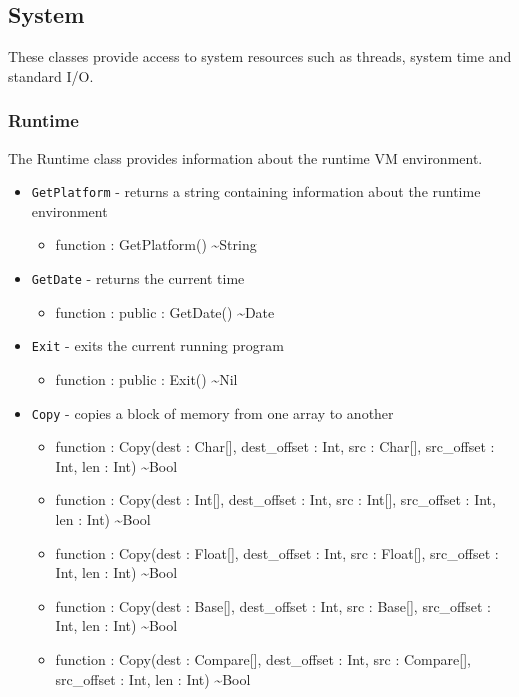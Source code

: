 \documentclass[11pt]{article}
\begin{document}
\subsection{System}
These classes provide access to system resources such as threads,
system time and standard I/O.

\subsubsection{Runtime}
The Runtime class provides information about the runtime VM
environment.
\begin{itemize}
\item \texttt{GetPlatform} - returns a string containing information
  about the runtime environment
  \begin{itemize}
  \item function : GetPlatform() \textasciitilde String
  \end{itemize}
\item \texttt{GetDate} - returns the current time
  \begin{itemize}
  \item function : public : GetDate() \textasciitilde Date
  \end{itemize}
\item \texttt{Exit} - exits the current running program
  \begin{itemize}
  \item function : public : Exit() \textasciitilde Nil
  \end{itemize}
\item \texttt{Copy} - copies a block of memory from one array to another
  \begin{itemize}
  \item function : Copy(dest : Char[], dest\_offset : Int, src : Char[], src\_offset : Int, len : Int) \textasciitilde Bool
  \item function : Copy(dest : Int[], dest\_offset : Int, src : Int[], src\_offset : Int, len : Int) \textasciitilde Bool
  \item function : Copy(dest : Float[], dest\_offset : Int, src : Float[], src\_offset : Int, len : Int) \textasciitilde Bool
  \item function : Copy(dest : Base[], dest\_offset : Int, src : Base[], src\_offset : Int, len : Int) \textasciitilde Bool
  \item function : Copy(dest : Compare[], dest\_offset : Int, src : Compare[], src\_offset : Int, len : Int) \textasciitilde Bool
  \end{itemize}
\end{itemize}
\end{document}
